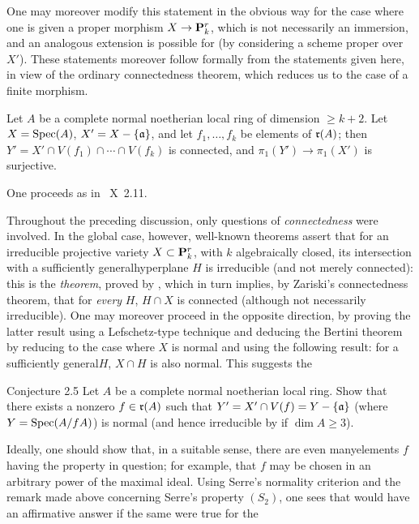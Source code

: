 One may moreover modify this statement in the
obvious way for the case where one is given a proper morphism
$X \to \mathbf P^r_k$, which is not necessarily an
immersion, and an analogous extension is possible for
 (by considering a scheme proper over~$X'$). These
statements moreover follow formally from the statements given
here, in view of the ordinary connectedness theorem, which
reduces us to the case of a finite morphism.

\begin{corollaire} \label{XIII.2.4}
Let $A$ be a complete normal noetherian local ring of dimension $\ge k+2$. Let $X=\operatorname{Spec} (A)$, $X'=X-\{ \mathfrak{a}\}$, and let $f_1, \dotsc, f_k$ be elements of $\mathfrak{r}(A)$; then $Y'=X'\cap V(f_1) \cap \dotsb \cap V(f_k)$ is connected, and $\pi_1(Y')\to \pi_1(X')$ is surjective.
\end{corollaire}

One proceeds as in ~X~2.11.

Throughout the preceding discussion, only questions of \emph{connectedness} were involved. In the global case, however, well-known theorems assert that for an irreducible projective variety $X\subset \mathbf P^r_k$, with $k$ algebraically closed, its intersection with a sufficiently \og general\fg hyperplane $H$ is irreducible (and not merely connected): this is the \emph{ theorem}, proved by , which in turn implies, by Zariski's connectedness theorem, that for \emph{every} $H$, $H\cap X$ is connected (although not necessarily irreducible). One may moreover proceed in the opposite direction, by proving the latter result using a Lefschetz-type technique and deducing the Bertini theorem by reducing to the case where $X$ is normal and using the following result: for a \og sufficiently general\fg $H$, $X\cap H$ is also normal. This suggests the

\label{XIII.2.5}
\begin{enonce*}{Conjecture 2.5\ndemark}
Let $A$ be a complete normal noetherian local ring. Show that there exists a nonzero $f\in\mathfrak{r}(A)$ such that $Y'=X'\cap V(f)=Y-\{ \mathfrak{a}\}$ (where\pageoriginale $Y=\operatorname{Spec} (A/fA)$) is normal (and hence irreducible by  if $\dim A\ge 3$).
\end{enonce*}

Ideally, one should show that, in a suitable sense, there are even \og many\fg elements $f$ having the property in question; for example, that $f$ may be chosen in an arbitrary power of the maximal ideal. Using Serre's normality criterion and the remark made above concerning Serre's property $(S_2)$, one sees that  would have an affirmative answer if the same were true for the

